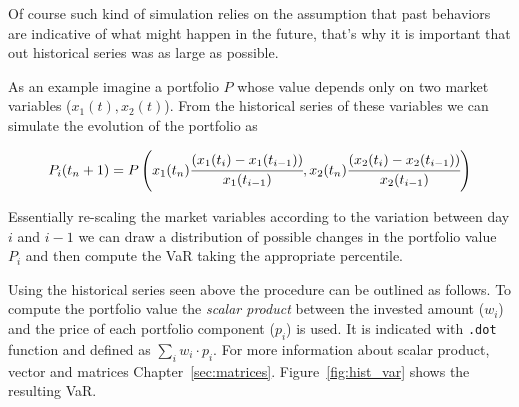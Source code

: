 Of course such kind of simulation relies on the assumption that past
behaviors are indicative of what might happen in the future, that's why it is important that out historical series was as large as possible.

As an example imagine a portfolio $P$ whose value depends only on two market variables (\(x_1(t), x_2(t)\)). From the historical series of these variables we can simulate the evolution of the portfolio as

\begin{equation}
P_i(t_n+1) = P\left(x_1(t_n)\cfrac{(x_1(t_i)-x_1(t_{i-1}))}{x_1(t_{i-1})}, x_2(t_n)\cfrac{(x_2(t_i)-x_2(t_{i-1}))}{x_2(t_{i-1})}\right)
\end{equation}

Essentially re-scaling the market variables according to the variation
between day \(i\) and \(i-1\) we can draw a distribution of possible
changes in the portfolio value \(P_i\) and then compute the VaR taking
the appropriate percentile.

Using the historical series seen above the procedure can be outlined as follows.
To compute the portfolio value the \emph{scalar product} between the invested 
amount ($w_i$) and the price of each portfolio component ($p_i$) is used. 
It is indicated with \texttt{.dot} function and defined as $\sum_{i} w_i \cdot p_i$.
For more information about scalar product, vector and matrices Chapter~\ref{sec:matrices}. 
Figure~\ref{fig:hist_var} shows the resulting VaR. 


